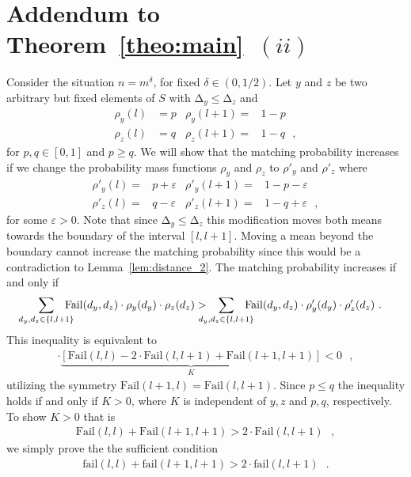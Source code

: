 \let\accentvec\vec \documentclass{llncs}
\newcommand{\degr}{\ensuremath{d}}
\newcommand{\pmf}{\ensuremath{{\rho}}}
\newcommand{\mean}{{\mathrm{\scriptstyle\Delta}}}
\newcommand{\eps}{\ensuremath{\varepsilon}}
\newcommand{\blank}{\text{ }}
\newcommand{\low}{\ensuremath{l}}
\newcommand{\Fail}{\mathrm{Fail}}
\newcommand{\fail}{\mathrm{fail}}
\newcommand{\mgap}{\hspace{-1em}}
\begin{document}
\section{Addendum to Theorem~\ref{theo:main}~$(ii)$}
Consider the situation $n=m^\delta$, for fixed $\delta\in(0,1/2)$.
Let $y$ and $z$ be two arbitrary but fixed elements of $S$ with $\mean_y\leq \mean_z$ and
\begin{align*}
\pmf_y(\low)&=p  & \pmf_y(\low+1)=&1-p\\
\pmf_z(\low)&=q  & \pmf_z(\low+1)=&1-q \blank,
\end{align*}
for $p,q \in [0,1]$ and $p\geq q$. We will show that the matching probability increases
if we change the probability mass functions $\pmf_y$ and $\pmf_z$  to $\pmf'_y$ and $\pmf'_z$ where
\begin{align*}
\pmf'_y(\low)=&p+\eps & \pmf'_y(\low+1)=&1-p-\eps\\
\pmf'_z(\low)=&q-\eps & \pmf'_z(\low+1)=&1-q+\eps \blank,
\end{align*}
for some $\eps > 0$. 
Note that since $\mean_y\leq \mean_z$ this modification moves both means towards the boundary of the interval $[\low,\low+1]$. Moving a mean beyond
the boundary cannot increase the matching probability since this would be a contradiction to Lemma~\ref{lem:distance_2}.
The matching probability increases if and only if
\begin{align*}
   \sum_{\degr_y,\degr_z\in\{\low,\low+1\}} \mgap \Fail(\degr_y,\degr_z) \cdot \rho_y(\degr_y)\cdot\rho_z(\degr_z) 
 &>\mgap\sum_{\degr_y,\degr_z\in\{\low,\low+1\}} \mgap\Fail(\degr_y,\degr_z) \cdot \rho'_y(\degr_y)\cdot\rho'_z(\degr_z) \blank.
\end{align*}
This inequality is equivalent to
\begin{align}
 [-\eps^2 -\eps\cdot(p-q)]\cdot \underbrace{[ \Fail(\low,\low) -2\cdot \Fail(\low,\low+1) + \Fail(\low+1,\low+1) ]}_K < 0 \blank,
\end{align}
utilizing the symmetry $\Fail(\low+1,\low)=\Fail(\low,\low+1)$. Since $p\leq q$ the inequality holds 
if and only if $K>0$, where $K$ is independent of $y,z$ and $p,q$, respectively.
To show $K>0$ that is 
\begin{align}
 \Fail(\low,\low)+\Fail(\low+1,\low+1)> 2\cdot \Fail(\low,\low+1) \blank,
\end{align}
we simply prove the the sufficient condition
\begin{align}
\fail(\low,\low)+\fail(\low+1,\low+1)> 2\cdot \fail(\low,\low+1) \blank.
\end{align}
\end{document}
